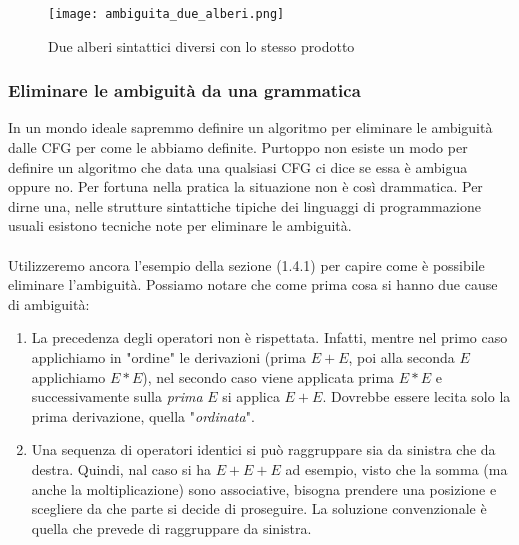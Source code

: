 \documentclass[11pt]{article}
\begin{document}
\begin{figure}[H]
\caption{Due alberi sintattici diversi con lo stesso prodotto}
\label{img:ambiguita_due_alberi}
\texttt{[image: ambiguita\_due\_alberi.png]}
\centering
\end{figure}

\subsubsection{Eliminare le ambiguità da una grammatica}
In un mondo ideale sapremmo definire un algoritmo per eliminare le ambiguità dalle CFG per come le abbiamo definite. Purtoppo non esiste un modo per definire un algoritmo che data una qualsiasi CFG ci dice se essa è ambigua oppure no. Per fortuna nella pratica la situazione non è così drammatica. Per dirne una, nelle strutture sintattiche tipiche dei linguaggi di programmazione usuali esistono tecniche note per eliminare le ambiguità.
\\ \\
Utilizzeremo ancora l'esempio della sezione (1.4.1) per capire come è possibile eliminare l'ambiguità.
Possiamo notare che come prima cosa si hanno due cause di ambiguità:
\begin{enumerate}
	\item La precedenza degli operatori non è rispettata. Infatti, mentre nel primo caso applichiamo in "ordine" le derivazioni (prima $E+E$, poi alla seconda $E$ applichiamo $E*E$), nel secondo caso viene applicata prima $E*E$ e successivamente sulla \textit{prima} $E$ si applica $E+E$. Dovrebbe essere lecita solo la prima derivazione, quella "\textit{ordinata}".
	\item Una sequenza di operatori identici si può raggruppare sia da sinistra che da destra. Quindi, nal caso si ha $E+E+E$ ad esempio, visto che la somma (ma anche la moltiplicazione) sono associative, bisogna prendere una posizione e scegliere da che parte si decide di proseguire. La soluzione convenzionale è quella che prevede di raggruppare da sinistra.
\end{enumerate}
\end{document}
